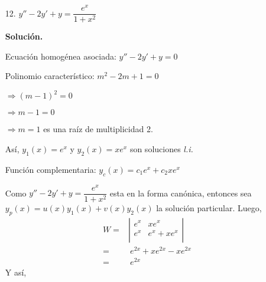 \documentclass[fleqn]{article}
\begin{document}
    \begin{enumerate}
        \item[12.] $ y'' - 2y' + y = \dfrac{e^x}{1+x^2} $ 
        
        \textbf{Solución.}

        Ecuación homogénea asociada: $ y'' - 2y' + y = 0 $ 

        Polinomio característico: $ m^2 - 2m + 1 = 0 $

        \hspace{3.2cm} $ \Longrightarrow (m - 1)^2 = 0 $

        \hspace{3.2cm} $ \Longrightarrow m - 1 = 0 $

        \hspace{3.2cm} $ \Longrightarrow m = 1 $ \; es una raíz de multiplicidad 2.

        Así, $ y_1(x) = e^x $ y $ y_2(x) = xe^x $ son soluciones \textit{l.i.}

        Función complementaria: $ y_c(x) = c_1e^x + c_2xe^x $
    
        Como $ \displaystyle y'' - 2y' + y = \dfrac{e^x}{1 + x^2} $ esta en la forma canónica, entonces sea $ y_p(x) = u(x)y_1(x) + v(x)y_2(x) $ la solución particular. Luego,
        \begin{align*}
            W =&
            \left\lvert 
                \begin{array}{ccc}
                    e^x & xe^x \\
                    e^x & e^x + xe^x \\
                \end{array}
            \right\rvert \\
            =& ~ e^{2x} + xe^{2x} - xe^{2x} \\
            =& ~ e^{2x}
        \end{align*}
        Y así, 
        \vspace{-7mm}


\end{enumerate}
\end{document}
